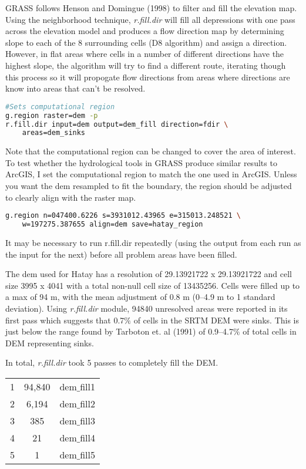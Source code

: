 GRASS follows Henson and Domingue (1998) to filter and fill the elevation map. Using the neighborhood technique, \textit{r.fill.dir} will fill all depressions with one pass across the elevation model and produces a flow direction map by determining slope to each of the 8 surrounding cells (D8 algorithm) and assign a direction. However, in flat areas where cells in a number of different directions have the highest slope, the algorithm will try to find a different route, iterating though this process so it will propogate flow directions from areas where directions are know into areas that can't be resolved. 

\begin{lstlisting}[language=bash]
#Sets computational region
g.region raster=dem -p
r.fill.dir input=dem output=dem_fill direction=fdir \
	areas=dem_sinks
\end{lstlisting}

Note that the computational region can be changed to cover the area of interest. To test whether the hydrological tools in GRASS produce similar results to ArcGIS, I set the computational region to match the one used in ArcGIS. Unless you want the dem resampled to fit the boundary, the region should be adjusted to clearly align with the raster map. 

\begin{lstlisting}[language=bash]
g.region n=047400.6226 s=3931012.43965 e=315013.248521 \
	w=197275.387655 align=dem save=hatay_region
\end{lstlisting}

It may be necessary to run r.fill.dir repeatedly (using the output from each run as the input for the next) before all problem areas have been filled. 

The dem used for Hatay has a resolution of 29.13921722 x 29.13921722 and cell size 3995 x 4041 with a total non-null cell size of 13435256. Cells were filled up to a max of 94 m, with the mean adjustment of 0.8 m (0--4.9 m to 1 standard deviation).  Using \textit{r.fill.dir} module, 94840 unresolved areas were reported in its first pass which suggests that 0.7${\%}$ of cells in the SRTM DEM were sinks. This is just below the range found by Tarboton et. al (1991) of 0.9--4.7${\%}$ of total cells in DEM representing sinks. 

In total, \textit{r.fill.dir} took 5 passes to completely fill the DEM. 

\begin{tabular}{ c c c }
1 & 94,840 & dem${\_}$fill1\\
2 & 6,194 & dem${\_}$fill2\\
3 & 385 & dem${\_}$fill3\\
4 & 21 & dem${\_}$fill4 \\
5 & 1 & dem${\_}$fill5
\end{tabular}

